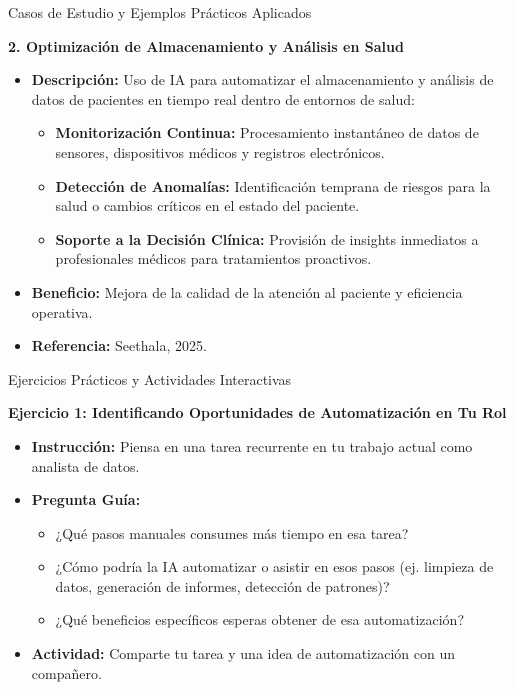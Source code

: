 \documentclass[aspectratio=169]{beamer}
\begin{document}
\begin{frame}{Casos de Estudio y Ejemplos Prácticos Aplicados}

\textbf{2. Optimización de Almacenamiento y Análisis en Salud}
\begin{itemize}
  \item \textbf{Descripción:} Uso de IA para automatizar el almacenamiento y análisis de datos de pacientes en tiempo real dentro de entornos de salud:
  \begin{itemize}
    \item \textbf{Monitorización Continua:} Procesamiento instantáneo de datos de sensores, dispositivos médicos y registros electrónicos.
    \item \textbf{Detección de Anomalías:} Identificación temprana de riesgos para la salud o cambios críticos en el estado del paciente.
    \item \textbf{Soporte a la Decisión Clínica:} Provisión de insights inmediatos a profesionales médicos para tratamientos proactivos.
  \end{itemize}
  \item \textbf{Beneficio:} Mejora de la calidad de la atención al paciente y eficiencia operativa.
  \item \textbf{Referencia:} Seethala, 2025.
\end{itemize}
\end{frame}

\begin{frame}{Ejercicios Prácticos y Actividades Interactivas}

\textbf{Ejercicio 1: Identificando Oportunidades de Automatización en Tu Rol}
\begin{itemize}
  \item \textbf{Instrucción:} Piensa en una tarea recurrente en tu trabajo actual como analista de datos.
  \item \textbf{Pregunta Guía:}
  \begin{itemize}
    \item ¿Qué pasos manuales consumes más tiempo en esa tarea?
    \item ¿Cómo podría la IA automatizar o asistir en esos pasos (ej. limpieza de datos, generación de informes, detección de patrones)?
    \item ¿Qué beneficios específicos esperas obtener de esa automatización?
  \end{itemize}
  \item \textbf{Actividad:} Comparte tu tarea y una idea de automatización con un compañero.
\end{itemize}
\end{frame}
\end{document}
